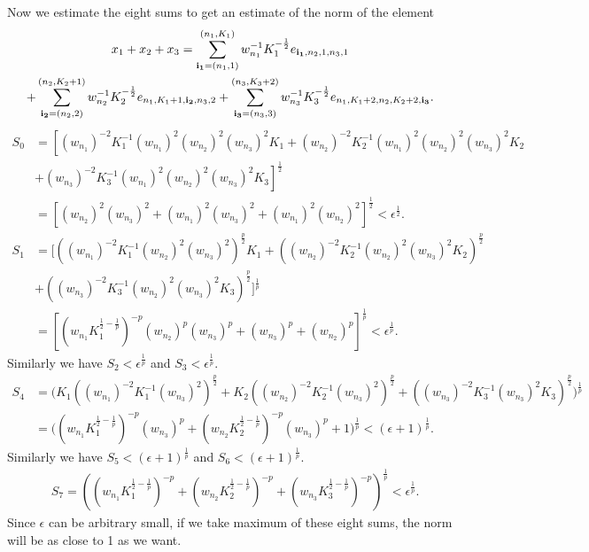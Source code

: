 \documentclass[12pt]{amsart}
\theoremstyle{definition}
\theoremstyle{remark}
\numberwithin{equation}{section}
\begin{document}
Now we estimate the eight sums to get an estimate of the norm of
 the element
\begin{multline}\label{vector}
x_1+x_2+x_3 =\sum_{{\bf{i_1}}=(n_1,1)}^{(n_1,K_1)}
 w_{n_1}^{-1}K_{1}^{-\frac{1}{2}}
 e_{{\bf{i_1}},n_2,1,n_3,1} \\ 
+\sum_{{\bf{i_2}}=(n_2,2)}^{(n_2,K_2+1)} 
w_{n_2}^{-1}K_{2}^{-\frac{1}{2}}
 e_{n_1,K_1+1,{\bf{i_2}},n_3,2}
+\sum_{{\bf{i_3}}=(n_3,3)}^{(n_3,K_3+2)}
  w_{n_3}^{-1}K_{3}^{-\frac{1}{2}}
 e_{n_1,K_1+2,n_2,K_2+2,{\bf{i_3}}}.
\end{multline}
\begin{align*}
S_0&=\left[(w_{n_1})^{-2}K_{1}^{-1}
(w_{n_1})^{2}
(w_{n_2})^{2}
(w_{n_3})^{2}K_1\right .
 +(w_{n_2})^{-2}K_{2}^{-1}
(w_{n_1})^{2}(w_{n_2})^{2}(w_{n_3})^{2}K_2\\
&\left .+(w_{n_3})^{-2}K_{3}^{-1}
(w_{n_1})^{2}(w_{n_2})^{2}(w_{n_3})^{2}K_3
\right]^{\frac{1}{2}}\\
& =\left[(w_{n_2})^{2}(w_{n_3})^{2}
+(w_{n_1})^{2}(w_{n_3})^{2}
+(w_{n_1})^{2}(w_{n_2})^{2}
\right]^{\frac{1}{2}}
 <{\epsilon}^{\frac{1}{2}}.\\
S_1&=[((w_{n_1})^{-2}K_{1}^{-1}
(w_{n_2})^{2}(w_{n_3})^{2})^{\frac{p}{2}}K_1
+((w_{n_2})^{-2}K_{2}^{-1}
(w_{n_2})^{2}(w_{n_3})^{2}K_2)^{\frac{p}{2}}\\
&+((w_{n_3})^{-2}K_{3}^{-1}
(w_{n_2})^{2}(w_{n_3})^{2}K_3)^{\frac{p}{2}}
]^{\frac{1}{p}}\\
&=[(w_{n_1}K_{1}^{\frac{1}{2}-\frac{1}{p}})^{-p}
(w_{n_2})^{p}(w_{n_3})^{p}+(w_{n_3})^{p}
+(w_{n_2})^{p}]^{\frac{1}{p}}<{\epsilon}^{\frac{1}{p}}.
\end{align*}
Similarly we have 
$S_2<{\epsilon}^{\frac{1}{p}}$
and
$S_3<{\epsilon}^{\frac{1}{p}}$.\\
\begin{align*}
S_4&=\big(K_1
((w_{n_1})^{-2}K_{1}^{-1}
(w_{n_3})^2)^{\frac{p}{2}}
+K_2
((w_{n_2})^{-2}K_{2}^{-1}
(w_{n_3})^2)^{\frac{p}{2}}
+((w_{n_3})^{-2}K_{3}^{-1}
(w_{n_3})^2K_3)^{\frac{p}{2}}
\big)^{\frac{1}{p}}\\
&=\big((w_{n_1}
K_{1}^{\frac{1}{2}-\frac{1}{p}})^{-p}
(w_{n_3})^p
+(w_{n_2}
K_{2}^{\frac{1}{2}-\frac{1}{p}})^{-p}
(w_{n_3})^p
+1\big)^{\frac{1}{p}}
<(\epsilon + 1)^{\frac 1 p}.
\end{align*}
Similarly we have 
$S_5<(\epsilon + 1)^{\frac 1 p}$
and
$S_6<(\epsilon + 1)^{\frac 1 p}$.\\
\begin{align*}
&S_7=((w_{n_1}K_{1}^{\frac{1}{2}-\frac{1}{p}})^{-p}
+(w_{n_2}K_{2}^{\frac{1}{2}-\frac{1}{p}})^{-p}
+(w_{n_3}K_{3}^{\frac{1}{2}-\frac{1}{p}})^{-p})^{\frac{1}{p}}
< {\epsilon}^{\frac 1 p}.
\end{align*}
Since $\epsilon $ can be arbitrary small, if we take maximum of
 these eight sums, the norm will be as close to 1 as we want.\\
\end{document}
